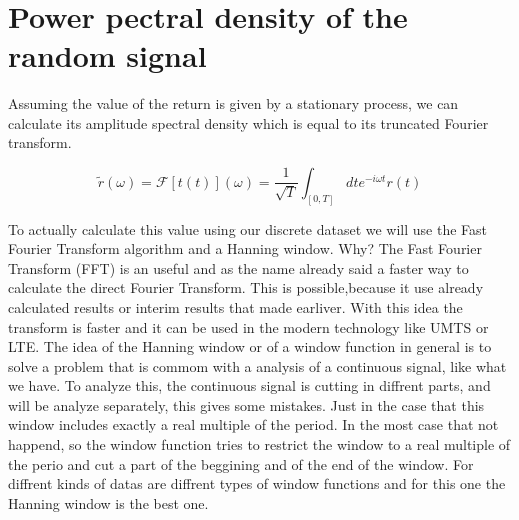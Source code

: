 \documentclass[11pt]{article}
\begin{document}
    \begin{center}
    \end{center}
    { \hspace*{\fill} \\}
    
    \hypertarget{power-pectral-density-of-the-random-signal}{%
\section{Power pectral density of the random
signal}\label{power-pectral-density-of-the-random-signal}}

Assuming the value of the return is given by a stationary process, we
can calculate its amplitude spectral density which is equal to its
truncated Fourier transform.

\[\widetilde{r}(\omega) = \mathscr{F}[t(t)](\omega) =\frac{1}{\sqrt{T}}\int_{[0,T]} dt e^{-i\omega t} r(t)\]

To actually calculate this value using our discrete dataset we will use
the Fast Fourier Transform algorithm and a Hanning window. Why? The Fast
Fourier Transform (FFT) is an useful and as the name already said a
faster way to calculate the direct Fourier Transform. This is
possible,because it use already calculated results or interim results
that made earliver. With this idea the transform is faster and it can be
used in the modern technology like UMTS or LTE. The idea of the Hanning
window or of a window function in general is to solve a problem that is
commom with a analysis of a continuous signal, like what we have. To
analyze this, the continuous signal is cutting in diffrent parts, and
will be analyze separately, this gives some mistakes. Just in the case
that this window includes exactly a real multiple of the period. In the
most case that not happend, so the window function tries to restrict the
window to a real multiple of the perio and cut a part of the beggining
and of the end of the window. For diffrent kinds of datas are diffrent
types of window functions and for this one the Hanning window is the
best one.
\end{document}
